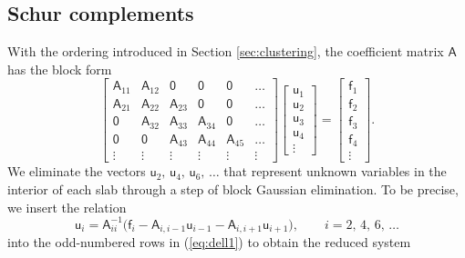 \documentclass[10pt,a4paper]{amsart}
\newcommand{\vct}[1]{\bm{\mathsf{#1}}}
\newcommand{\mtx}[1]{\bm{\mathsf{#1}}}
\begin{document}
\subsection{Schur complements}
With the ordering introduced in Section \ref{sec:clustering}, the
coefficient matrix $\mtx{A}$ has the block form
\begin{equation}
\label{eq:dell1}
\begin{bmatrix}
\mtx A_{11} & \mtx A_{12} & \mtx 0 & \mtx 0 & \mtx 0 & \dots \\
\mtx A_{21} & \mtx A_{22} & \mtx A_{23} & \mtx 0 &  \mtx 0 & \dots \\
\mtx 0 & \mtx A_{32} & \mtx A_{33} & \mtx A_{34} &   \mtx 0 & \dots\\
\mtx{0} & \mtx 0 & \mtx A_{43} & \mtx A_{44} & \mtx A_{45} & \dots\\
\vdots & \vdots & \vdots & \vdots & \vdots & \vdots
\end{bmatrix}
\begin{bmatrix} \mtx u_1\\\mtx u_2\\ \mtx u_3 \\ \mtx u_4 \\ \vdots \end{bmatrix} =
\begin{bmatrix} \mtx f_1\\ \mtx f_2\\ \mtx f_3\\ \mtx f_4 \\ \vdots        \end{bmatrix}.
\end{equation}
We eliminate the vectors $\vct{u}_{2},\,\vct{u}_{4},\,\vct{u}_{6},\,\dots$
that represent unknown variables in the interior of each slab through a 
step of block Gaussian elimination. To be precise, we insert the relation
\begin{equation}
\vct{u}_{i} = 
\mtx{A}_{ii}^{-1}\bigl(\vct{f}_{i} - \mtx{A}_{i,i-1}\vct{u}_{i-1} - \mtx{A}_{i,i+1}\vct{u}_{i+1}\bigr),
\qquad i = 2,\,4,\,6,\,\dots
\label{eq:usol_even}
\end{equation}
into the odd-numbered rows in (\ref{eq:dell1}) to obtain the reduced system
\end{document}
